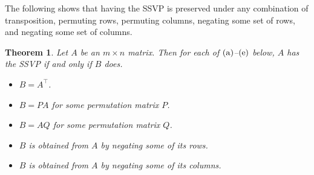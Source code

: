 \documentclass[preprint,12pt]{elsarticle}
\newcommand{\trans  }{^\top}
\newtheorem{theorem}{Theorem}[section]
\begin{document}
The following shows that having the SSVP is preserved under any combination of 
transposition, permuting rows, permuting columns, negating some set of rows, and 
negating some set of columns. 

\begin{theorem}
\label{equiv}
Let $A$ be an $m\times n$ matrix.
Then for each of $\rm (a)$--$ \rm (e)$ below, 
$A$ has the SSVP if and only if $B$ does. 
\begin{itemize}
\item[\rm (a)] $B=A\trans $.
\item[\rm (b)] $B=PA$ for some permutation matrix $P$.
\item[\rm (c)] $B=AQ$ for some permutation matrix $Q$.
\item[\rm (d)] $B$ is obtained from $A$ by negating some of its rows.
\item[\rm (e)] $B$ is obtained from $A$ by negating some of its columns.
\end{itemize}
\end{theorem}
\end{document}
